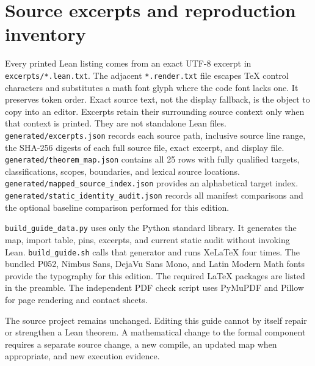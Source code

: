 \documentclass[11pt,a4paper]{article}
\newcommand{\code}[1]{\nolinkurl{#1}}
\begin{document}
\section{Source excerpts and reproduction inventory}\label{app:inventory}
Every printed Lean listing comes from an exact UTF-8 excerpt in \code{excerpts/*.lean.txt}. The adjacent \code{*.render.txt} file escapes TeX control characters and substitutes a math font glyph where the code font lacks one. It preserves token order. Exact source text, not the display fallback, is the object to copy into an editor. Excerpts retain their surrounding source context only when that context is printed. They are not standalone Lean files.
\code{generated/excerpts.json} records each source path, inclusive source line range, the SHA-256 digests of each full source file, exact excerpt, and display file. \code{generated/theorem_map.json} contains all 25 rows with fully qualified targets, classifications, scopes, boundaries, and lexical source locations. \code{generated/mapped_source_index.json} provides an alphabetical target index. \code{generated/static_identity_audit.json} records all manifest comparisons and the optional baseline comparison performed for this edition.

\code{build_guide_data.py} uses only the Python standard library. It generates the map, import table, pins, excerpts, and current static audit without invoking Lean. \code{build_guide.sh} calls that generator and runs XeLaTeX four times. The bundled P052, Nimbus Sans, DejaVu Sans Mono, and Latin Modern Math fonts provide the typography for this edition. The required LaTeX packages are listed in the preamble. The independent PDF check script uses PyMuPDF and Pillow for page rendering and contact sheets.

The source project remains unchanged. Editing this guide cannot by itself repair or strengthen a Lean theorem. A mathematical change to the formal component requires a separate source change, a new compile, an updated map when appropriate, and new execution evidence.
\end{document}
